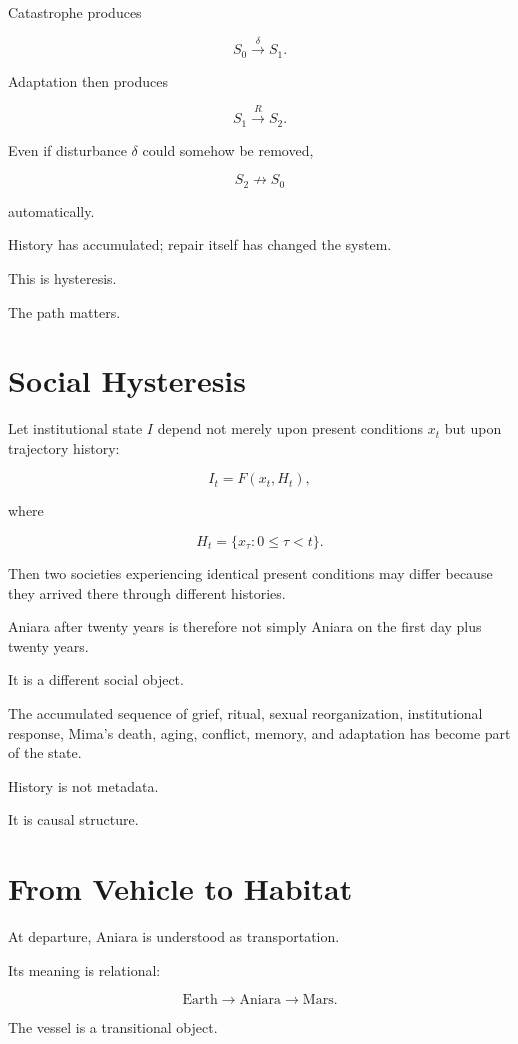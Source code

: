 \documentclass[11pt,oneside]{book}
\theoremstyle{definition}
\theoremstyle{remark}
\begin{document}
Catastrophe produces

\[
S_0\xrightarrow{\delta}S_1.
\]

Adaptation then produces

\[
S_1\xrightarrow{R}S_2.
\]

Even if disturbance \(\delta\) could somehow be removed,

\[
S_2
\not\rightarrow
S_0
\]

automatically.

History has accumulated; repair itself has changed the system.

This is hysteresis.

The path matters.

\section{Social Hysteresis}

Let institutional state \(I\) depend not merely upon present conditions \(x_t\) but upon trajectory history:

\[
I_t
=
F(x_t,H_t),
\]

where

\[
H_t
=
\{x_\tau:0\leq\tau<t\}.
\]

Then two societies experiencing identical present conditions may differ because they arrived there through different histories.

Aniara after twenty years is therefore not simply Aniara on the first day plus twenty years.

It is a different social object.

The accumulated sequence of grief, ritual, sexual reorganization, institutional response, Mima's death, aging, conflict, memory, and adaptation has become part of the state.

History is not metadata.

It is causal structure.

\section{From Vehicle to Habitat}

At departure, Aniara is understood as transportation.

Its meaning is relational:

\[
\text{Earth}
\rightarrow
\text{Aniara}
\rightarrow
\text{Mars}.
\]

The vessel is a transitional object.
\end{document}
